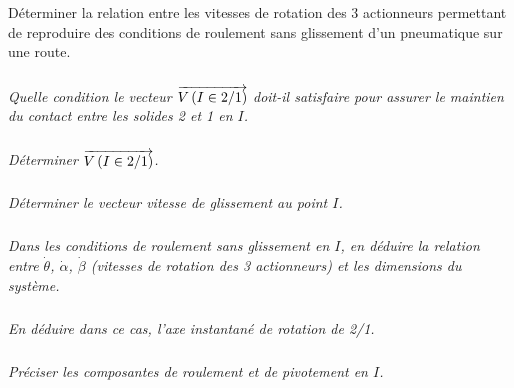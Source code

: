 \documentclass[10pt]{article}
\begin{document}
\begin{Objectif}
Déterminer la relation entre les vitesses de rotation des 3 actionneurs permettant de reproduire 
des conditions de roulement sans glissement d’un pneumatique sur une route. 
\end{Objectif}

\subparagraph{}
\textit{Quelle condition le vecteur $\overrightarrow{V\left( {I} \in {2}/{1}\right)}$ doit-il satisfaire pour assurer le maintien du contact entre les solides 2 et 1 en $I$.}

\subparagraph{}
\textit{Déterminer $\overrightarrow{V\left( {I} \in {2}/{1}\right)}$.}

\subparagraph{}
\textit{Déterminer le vecteur vitesse de glissement au point $I$.}%

\subparagraph{}
\textit{Dans les conditions de roulement sans glissement en $I$, en déduire la relation entre $\dot{\theta}$, $\dot{\alpha}$, $\dot{\beta}$ (vitesses de rotation des 3 actionneurs) et les dimensions du système.}

\subparagraph{}
\textit{En déduire dans ce cas, l’axe instantané de rotation de 2/1.}

\subparagraph{}
\textit{Préciser les composantes de roulement et de pivotement en $I$.}
\end{document}
